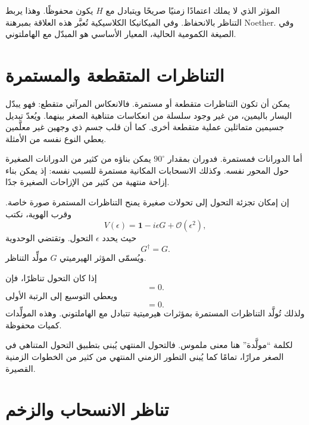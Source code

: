 المؤثر الذي لا يملك اعتمادًا زمنيًا صريحًا ويتبادل مع \(H\) يكون محفوظًا. وهذا يربط التناظر بالانحفاظ. وفي الميكانيكا الكلاسيكية تُعبَّر هذه العلاقة بمبرهنة Noether. وفي الصيغة الكمومية الحالية، المعيار الأساسي هو المبدّل مع الهاملتوني.

\section{التناظرات المتقطعة والمستمرة}

يمكن أن تكون التناظرات متقطعة أو مستمرة. فالانعكاس المرآتي متقطع: فهو يبدّل اليسار باليمين، من غير وجود سلسلة من انعكاسات متناهية الصغر بينهما. ويُعدّ تبديل جسيمين متماثلين عملية متقطعة أخرى. كما أن قلب جسم ذي وجهين غير معلَّمين يعطي النوع نفسه من الأمثلة.

أما الدورانات فمستمرة. فدوران بمقدار \(90^\circ\) يمكن بناؤه من كثير من الدورانات الصغيرة حول المحور نفسه. وكذلك الانسحابات المكانية مستمرة للسبب نفسه: إذ يمكن بناء إزاحة منتهية من كثير من الإزاحات الصغيرة جدًا.

إن إمكان تجزئة التحول إلى تحولات صغيرة يمنح التناظرات المستمرة صورة خاصة. وقرب الهوية، نكتب
\begin{equation}
V(\epsilon)
=
\mathbf 1-i\epsilon G+\mathcal O(\epsilon^2),
\end{equation}
حيث يحدد \(\epsilon\) التحول. وتقتضي الوحدوية
\begin{equation}
G^\dagger=G.
\end{equation}
ويُسمّى المؤثر الهيرميتي \(G\) مولِّد التناظر.

إذا كان التحول تناظرًا، فإن
\begin{equation}
[H,V(\epsilon)]=0.
\end{equation}
ويعطي التوسيع إلى الرتبة الأولى
\begin{equation}
[H,G]=0.
\end{equation}
ولذلك تُولَّد التناظرات المستمرة بمؤثرات هيرميتية تتبادل مع الهاملتوني. وهذه المولِّدات كميات محفوظة.

لكلمة ``مولَّدة'' هنا معنى ملموس. فالتحول المنتهي يُبنى بتطبيق التحول المتناهي في الصغر مرارًا، تمامًا كما يُبنى التطور الزمني المنتهي من كثير من الخطوات الزمنية القصيرة.

\section{تناظر الانسحاب والزخم}

